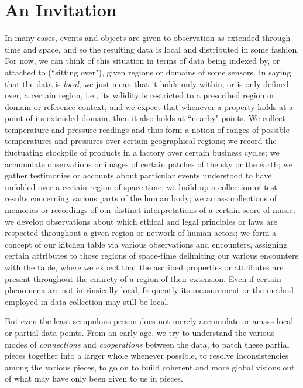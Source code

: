 \documentclass[11pt]{book}
\theoremstyle{definition}
\theoremstyle{definition}
\theoremstyle{definition}
\theoremstyle{theorem}
\theoremstyle{definition}
\begin{document}
	\section{An Invitation} 
	In many cases, events and objects are given to observation as extended through time and space, and so the resulting data is local and distributed in some fashion. For now, we can think of this situation in terms of data being indexed by, or attached to (``sitting over"), given regions or domains of some sensors. In saying that the data is \textit{local}, we just mean that it holds only within, or is only defined over, a certain region, i.e., its validity is restricted to a prescribed region or domain or reference context, and we expect that whenever a property holds at a point of its extended domain, then it also holds at ``nearby" points. We collect temperature and pressure readings and thus form a notion of ranges of possible temperatures and pressures over certain geographical regions; we record the fluctuating stockpile of products in a factory over certain business cycles; we accumulate observations or images of certain patches of the sky or the earth; we gather testimonies or accounts about particular events understood to have unfolded over a certain region of space-time; we build up a collection of test results concerning various parts of the human body; we amass collections of memories or recordings of our distinct interpretations of a certain score of music; we develop observations about which ethical and legal principles or laws are respected throughout a given region or network of human actors; we form a concept of our kitchen table via various observations and encounters, assigning certain attributes to those regions of space-time delimiting our various encounters with the table, where we expect that the ascribed properties or attributes are present throughout the entirety of a region of their extension. Even if certain phenomena are not intrinsically local, frequently its measurement or the method employed in data collection may still be local. \par 
	But even the least scrupulous person does not merely accumulate or amass local or partial data points. From an early age, we try to understand the various modes of \textit{connections} and \textit{cooperations} between the data, to patch these partial pieces together into a larger whole whenever possible, to resolve inconsistencies among the various pieces, to go on to build coherent and more global visions out of what may have only been given to us in pieces.
\end{document}

